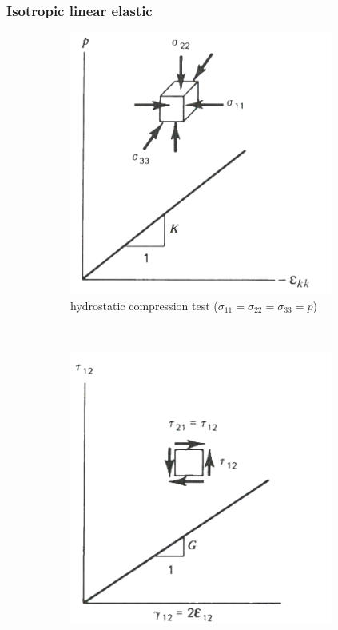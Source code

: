 \documentclass[notes]{beamer}
\begin{document}
\begin{frame}
\frametitle{Isotropic linear elastic}
 \begin{figure}[t!]
		\centering
		\begin{subfigure}[t]{0.5\textwidth}
			\centering
			\includegraphics[width=0.95\textwidth]{figs/isotropic-linear-elastic.png}
			\caption{hydrostatic compression test ($\sigma_{11} = \sigma_{22} = \sigma_{33} = p$) }
		\end{subfigure}%
		~ 
		\begin{subfigure}[t]{0.5\textwidth}
			\centering
			\includegraphics[width=0.95\textwidth]{figs/isotropic-linear-elastic-4.png}

\end{subfigure}
\end{figure}
\end{frame}
\end{document}

